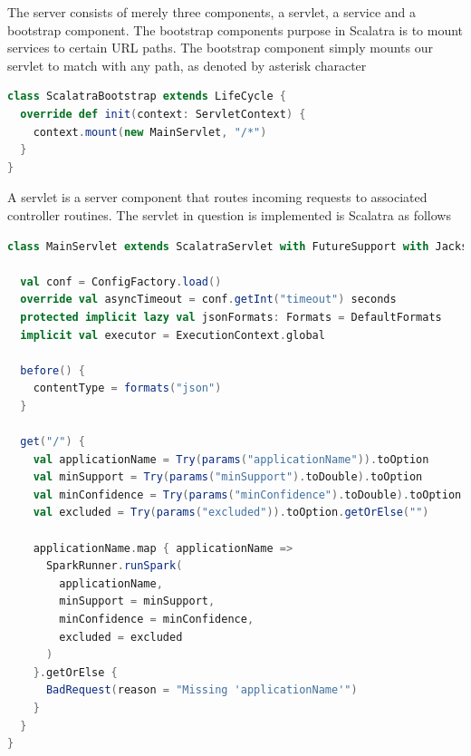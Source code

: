 The server consists of merely three components, a servlet, a service and a bootstrap component. The bootstrap components purpose in Scalatra is to mount services to certain URL paths. The bootstrap component simply mounts our servlet to match with any path, as denoted by asterisk character 
\begin{minipage}{\linewidth}
\begin{lstlisting}[language=scala]
class ScalatraBootstrap extends LifeCycle {
  override def init(context: ServletContext) {
    context.mount(new MainServlet, "/*")
  }
}
\end{lstlisting}
\end{minipage}   

A servlet is a server component that routes incoming requests to associated controller routines. The servlet in question is implemented is Scalatra as follows

\begin{minipage}{0.95\linewidth}
\begin{lstlisting}[language=scala]
class MainServlet extends ScalatraServlet with FutureSupport with JacksonJsonSupport {

  val conf = ConfigFactory.load()
  override val asyncTimeout = conf.getInt("timeout") seconds
  protected implicit lazy val jsonFormats: Formats = DefaultFormats
  implicit val executor = ExecutionContext.global
  
  before() {
    contentType = formats("json")
  }
	
  get("/") {
    val applicationName = Try(params("applicationName")).toOption
	val minSupport = Try(params("minSupport").toDouble).toOption
	val minConfidence = Try(params("minConfidence").toDouble).toOption
    val excluded = Try(params("excluded")).toOption.getOrElse("")

    applicationName.map { applicationName =>
      SparkRunner.runSpark(
        applicationName,
        minSupport = minSupport,
        minConfidence = minConfidence,
        excluded = excluded
      )
    }.getOrElse {
      BadRequest(reason = "Missing 'applicationName'")
    }
  }
}
\end{lstlisting}
\end{minipage}  

